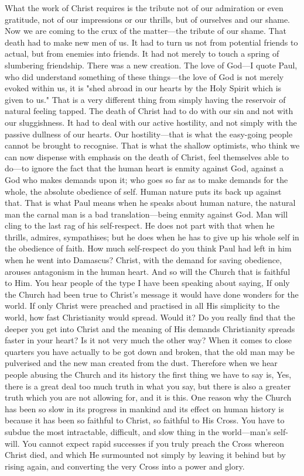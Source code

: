 \documentclass[draft]{ptfdoc}
\begin{document}
What the work of Christ requires is the 
tribute not of our admiration or even gratitude, 
not of our impressions or our thrills, but 
of ourselves and our shame. Now we are coming 
to the crux of the matter---the tribute of our 
shame. That death had to make new men of 
us. It had to turn us not from potential friends 
to actual, but from enemies into friends. It 
had not merely to touch a spring of slumbering 
friendship. There was a new creation. The 
love of God---I quote Paul, who did understand 
something of these things---the love of God is 
not merely evoked within us, it is "shed abroad 
in our hearts by the Holy Spirit which is given 
to us." That is a very different thing from 
simply having the reservoir of natural feeling 
tapped. The death of Christ had to do with 
our sin and not with our sluggishness. It had 
to deal with our active hostility, and not simply 
with the passive dullness of our hearts. Our 
hostility---that is what the easy-going people
cannot be brought to recognise. That is what 
the shallow optimists, who think we can now 
dispense with emphasis on the death of Christ, 
feel themselves able to do---to ignore the fact 
that the human heart is enmity against God, 
against a God who makes demands upon it; 
who goes so far as to make demands for 
the whole, the absolute obedience of self. 
Human nature puts its back up against that. 
That is what Paul means when he speaks 
about human nature, the natural man the 
carnal man is a bad translation---being enmity 
against God. Man will cling to the last rag of 
his self-respect. He does not part with that 
when he thrills, admires, sympathises; but he
does when he has to give up his whole self in 
the obedience of faith. How much self-respect 
do you think Paul had left in him when he went 
into Damascus? Christ, with the demand for 
saving obedience, arouses antagonism in the 
human heart. And so will the Church that 
is faithful to Him. You hear people of the 
type I have been speaking about saying, If 
only the Church had been true to Christ's 
message it would have done wonders for the 
world. If only Christ were preached and practised 
in all His simplicity to the world, how fast 
Christianity would spread. Would it? Do you
really find that the deeper you get into Christ 
and the meaning of His demands Christianity 
spreads faster in your heart? Is it not very 
much the other way? When it comes to close 
quarters you have actually to be got down and 
broken, that the old man may be pulverised and 
the new man created from the dust. Therefore 
when we hear people abusing the Church 
and its history the first thing we have to say 
is, Yes, there is a great deal too much truth 
in what you say, but there is also a greater 
truth which you are not allowing for, and it 
is this. One reason why the Church has 
been so slow in its progress in mankind and 
its effect on human history is because it has 
been so faithful to Christ, so faithful to His 
Cross. You have to subdue the most intractable, 
difficult, and slow thing in the world---man's 
self-will. You cannot expect rapid successes 
if you truly preach the Cross whereon 
Christ died, and which He surmounted not 
simply by leaving it behind but by rising again, 
and converting the very Cross into a power
and glory. 
\end{document}
